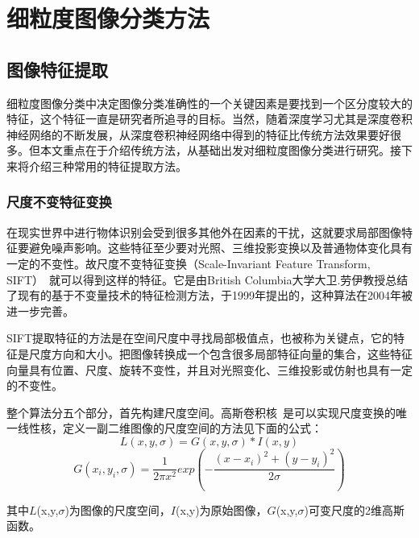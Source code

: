 \chapter{细粒度图像分类方法}
\label{cha:fangfa}

\section{图像特征提取}
\label{sec:tezhengtiqu}
细粒度图像分类中决定图像分类准确性的一个关键因素是要找到一个区分度较大的特征，这个特征一直是研究者所追寻的目标。当然，随着深度学习尤其是深度卷积神经网络的不断发展，从深度卷积神经网络中得到的特征比传统方法效果要好很多。但本文重点在于介绍传统方法，从基础出发对细粒度图像分类进行研究。接下来将介绍三种常用的特征提取方法。

\subsection{尺度不变特征变换}
\label{sec:sift}
在现实世界中进行物体识别会受到很多其他外在因素的干扰，这就要求局部图像特征要避免噪声影响。这些特征至少要对光照、三维投影变换以及普通物体变化具有一定的不变性。故尺度不变特征变换（Scale-Invariant Feature Transform, SIFT）~\cite{lowe1999object}就可以得到这样的特征。它是由British Columbia大学大卫.劳伊教授总结了现有的基于不变量技术的特征检测方法，于1999年提出的，这种算法在2004年被进一步完善。

 SIFT提取特征的方法是在空间尺度中寻找局部极值点，也被称为关键点，它的特征是尺度方向和大小。把图像转换成一个包含很多局部特征向量的集合，这些特征向量具有位置、尺度、旋转不变性，并且对光照变化、三维投影或仿射也具有一定的不变性。

整个算法分五个部分，首先构建尺度空间。高斯卷积核~\cite{lindeberg1994scale}是可以实现尺度变换的唯一线性核，定义一副二维图像的尺度空间的方法见下面的公式：
\begin{equation}
 L(x,y,\sigma) = G(x,y,\sigma) \ast I(x,y)
\end{equation}
\begin{equation}
G(x_i,y_i,\sigma) = \frac{1}{2 \pi x^{2}}exp(-\frac{(x-x_i)^{2}+(y-y_i)^{2}}{2\sigma})
\end{equation}

其中$L$(x,y,$\sigma$)为图像的尺度空间，$I$(x,y)为原始图像，$G$(x,y,$\sigma$)可变尺度的2维高斯函数。

